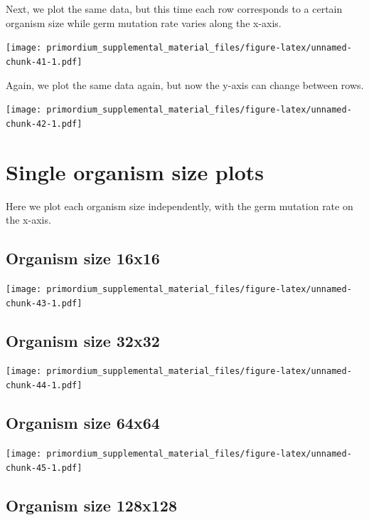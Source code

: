 \documentclass[
]{book}
\begin{document}
Next, we plot the same data, but this time each row corresponds to a certain organism size while germ mutation rate varies along the x-axis.

\texttt{[image: primordium\_supplemental\_material\_files/figure-latex/unnamed-chunk-41-1.pdf]}

Again, we plot the same data again, but now the y-axis can change between rows.

\texttt{[image: primordium\_supplemental\_material\_files/figure-latex/unnamed-chunk-42-1.pdf]}

\hypertarget{single-organism-size-plots-1}{%
\section{Single organism size plots}\label{single-organism-size-plots-1}}

Here we plot each organism size independently, with the germ mutation rate on the x-axis.

\hypertarget{organism-size-16x16-1}{%
\subsection{Organism size 16x16}\label{organism-size-16x16-1}}

\texttt{[image: primordium\_supplemental\_material\_files/figure-latex/unnamed-chunk-43-1.pdf]}

\hypertarget{organism-size-32x32-1}{%
\subsection{Organism size 32x32}\label{organism-size-32x32-1}}

\texttt{[image: primordium\_supplemental\_material\_files/figure-latex/unnamed-chunk-44-1.pdf]}

\hypertarget{organism-size-64x64-1}{%
\subsection{Organism size 64x64}\label{organism-size-64x64-1}}

\texttt{[image: primordium\_supplemental\_material\_files/figure-latex/unnamed-chunk-45-1.pdf]}

\hypertarget{organism-size-128x128-1}{%
\subsection{Organism size 128x128}\label{organism-size-128x128-1}}
\end{document}
